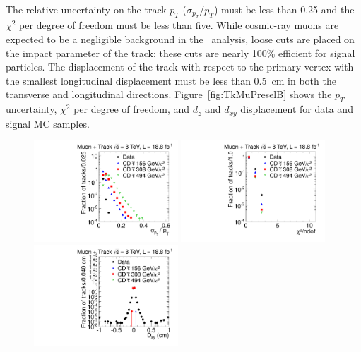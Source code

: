 The relative uncertainty on the track $p_T$ ($\sigma_{p_T}/p_T$) must be less than 0.25 and the $\chi^2$ per degree of freedom must be less than five.
While cosmic-ray muons are expected to be a negligible background in the \tktof\ analysis, loose cuts are placed on the impact parameter of the track;
these cuts are nearly 100\% efficient for signal particles.
The displacement of the track with respect to the primary vertex
with the smallest longitudinal displacement must be less than 0.5~cm in both the transverse and longitudinal directions.
Figure~\ref{fig:TkMuPreselB} shows the $p_T$ uncertainty, $\chi^2$ per degree of freedom, and $d_z$ and $d_{xy}$ displacement for data and signal MC samples.

\begin{figure}
\centering
  \includegraphics[clip=false, trim=0.0cm 0cm 0.0cm 0cm, width=0.48\textwidth]{figures/tkmu/Selection_Comp_8TeV_GMStau_Pterr_BS}
  \includegraphics[clip=false, trim=0.0cm 0cm 0.0cm 0cm, width=0.48\textwidth]{figures/tkmu/Selection_Comp_8TeV_GMStau_Chi2_BS} \\
  \includegraphics[clip=false, trim=0.0cm 0cm 0.0cm 0cm, width=0.48\textwidth]{figures/tkmu/Selection_Comp_8TeV_GMStau_Dxy_BS}

\end{figure}
